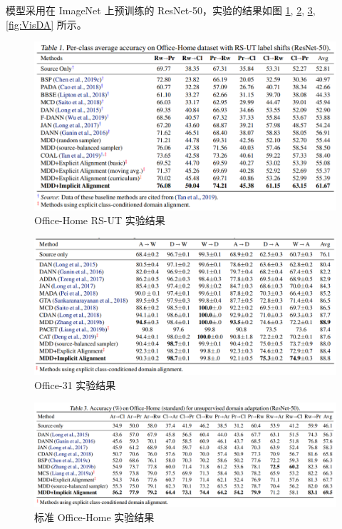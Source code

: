 \documentclass[UTF8]{ctexart}
\begin{document}
                模型采用在 ImageNet 上预训练的 ResNet-50，实验的结果如图 \ref{fig:RS-UT}, \ref{fig:Office-31}, \ref{fig:Office-Home}, \ref{fig:VisDA} 所示。

                \begin{figure}[ht]
                    \centering
                    \includegraphics[scale=0.4]{Week07_RS-UT.png}
                    \caption{Office-Home RS-UT 实验结果}
                    \label{fig:RS-UT}
                \end{figure}

                \begin{figure}[ht]
                    \centering
                    \includegraphics[scale=0.4]{Week07_Office-31.png}
                    \caption{Office-31 实验结果}
                    \label{fig:Office-31}
                \end{figure}

                \begin{figure}[ht]
                    \centering
                    \includegraphics[scale=0.3]{Week07_Office-Home.png}
                    \caption{标准 Office-Home 实验结果}
                    \label{fig:Office-Home}
                \end{figure}
\end{document}
